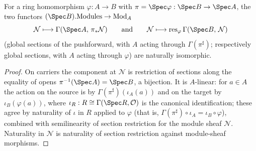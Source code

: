 \begin{lemma}
  \label{lem:pullbackTilde_gammaBridge}
  \leanok
  For a ring homomorphism \(\varphi : A \to B\) with
  \(\pi = \Spec\varphi : \Spec B \to \Spec A\), the two functors
  \((\Spec B).\mathrm{Modules} \to \mathrm{Mod}_{A}\)
  \[
    \mathcal N \longmapsto \Gamma(\Spec A,\, \pi_{*}\mathcal N)
    \qquad\text{and}\qquad
    \mathcal N \longmapsto \mathrm{res}_{\varphi}\, \Gamma(\Spec B,\, \mathcal N)
  \]
  (global sections of the pushforward, with \(A\) acting through
  \(\Gamma(\pi^{\sharp})\); respectively global sections, with \(A\)
  acting through \(\varphi\)) are naturally isomorphic.
\end{lemma}
\begin{proof}
  \leanok
  On carriers the component at \(\mathcal N\) is restriction of sections
  along the equality of opens \(\pi^{-1}(\Spec A) = \Spec B\), a
  bijection. It is \(A\)-linear: for \(a \in A\) the action on the
  source is by \(\Gamma(\pi^{\sharp})(\iota_A(a))\) and on the target by
  \(\iota_B(\varphi(a))\), where
  \(\iota_R : R \cong \Gamma(\Spec R, \mathcal O)\) is the canonical
  identification; these agree by naturality of \(\iota\) in \(R\)
  applied to \(\varphi\) (that is,
  \(\Gamma(\pi^{\sharp}) \circ \iota_A = \iota_B \circ \varphi\)),
  combined with semilinearity of section restriction for the module
  sheaf \(\mathcal N\). Naturality in \(\mathcal N\) is naturality of
  section restriction against module-sheaf morphisms.
\end{proof}

